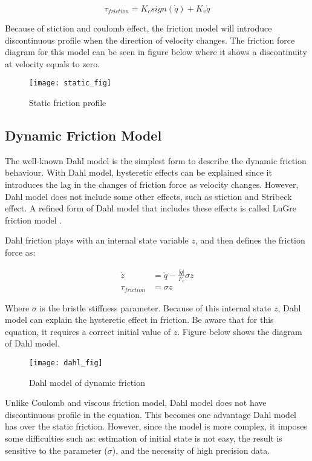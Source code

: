 \begin{equation}
  \tau_{friction} = K_{c} sign\left(\dot{q}\right) + K_{v} \dot{q}
\end{equation}

Because of stiction and coulomb effect, the friction model will introduce discontinuous profile when the direction of velocity changes. The friction force diagram for this model can be seen in figure below where it shows a discontinuity at velocity equals to zero.

\begin{figure}[H]
    \centering
    \texttt{[image: static\_fig]}
    \caption{Static friction profile}
    \label{fig:static fric}
\end{figure}


\subsection{Dynamic Friction Model}
The well-known Dahl model is the simplest form to describe the dynamic friction behaviour. With Dahl model, hysteretic effects can be explained since it introduces the lag in the changes of friction force as velocity changes. However, Dahl model does not include some other effects, such as stiction and Stribeck effect. A refined form of Dahl model that includes these effects is called LuGre friction model \cite{Bona05}.

Dahl friction plays with an internal state variable $z$, and then defines the friction force as:

\begin{align}
  \dot{z} &= \dot{q} - \frac{\left|\dot{q}\right|}{F_{c}} \sigma z \\
  \tau_{friction} &= \sigma z
\end{align}

Where $\sigma$ is the bristle stiffness parameter. Because of this internal state $z$, Dahl model can explain the hysteretic effect in friction. Be aware that for this equation, it requires a correct initial value of $z$. Figure below shows the diagram of Dahl model.  

\begin{figure}[H]
    \centering
    \texttt{[image: dahl\_fig]}
    \caption{Dahl model of dynamic friction}
    \label{fig:Dahl fric}
\end{figure}

Unlike Coulomb and viscous friction model, Dahl model does not have discontinuous profile in the equation. This becomes one advantage Dahl model has over the static friction. However, since the model is more complex, it imposes some difficulties such as: estimation of initial state is not easy, the result is sensitive to the parameter ($\sigma$), and the necessity of high precision data. 
